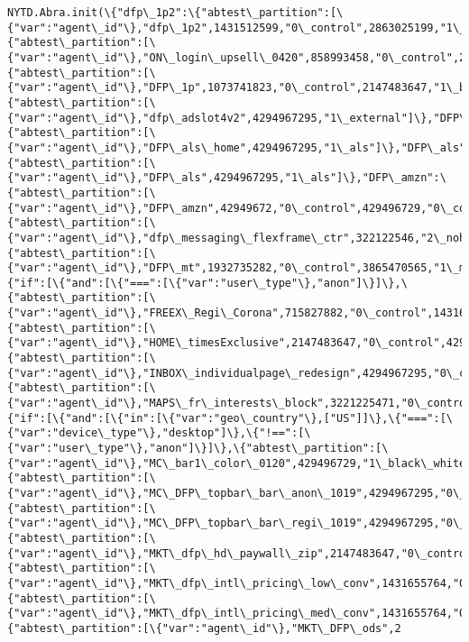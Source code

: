 \documentclass[11pt]{article}
\begin{document}
\begin{Verbatim}[commandchars=\\\{\}]
               NYTD.Abra.init(\{"dfp\_1p2":\{"abtest\_partition":[\{"var":"agent\_id"\},"dfp\_1p2",1431512599,"0\_control",2863025199,"1\_bk",4294537798,"2\_fp"]\},"ON\_login\_upsell\_0420":\{"abtest\_partition":[\{"var":"agent\_id"\},"ON\_login\_upsell\_0420",858993458,"0\_control",2576980377,"1\_offer",4294967295,"2\_brand"]\},"DFP\_1p":\{"abtest\_partition":[\{"var":"agent\_id"\},"DFP\_1p",1073741823,"0\_control",2147483647,"1\_bk",4294967295,"2\_fp"]\},"dfp\_adslot4v2":\{"abtest\_partition":[\{"var":"agent\_id"\},"dfp\_adslot4v2",4294967295,"1\_external"]\},"DFP\_als\_home":\{"abtest\_partition":[\{"var":"agent\_id"\},"DFP\_als\_home",4294967295,"1\_als"]\},"DFP\_als":\{"abtest\_partition":[\{"var":"agent\_id"\},"DFP\_als",4294967295,"1\_als"]\},"DFP\_amzn":\{"abtest\_partition":[\{"var":"agent\_id"\},"DFP\_amzn",42949672,"0\_control",429496729,"0\_control",472446402,"1\_amzn\_fast\_fetch",515396075,"2\_adslot\_priority",901943131,"2\_adslot\_priority",944892804,"3\_no\_mnet"]\},"dfp\_messaging\_flexframe\_ctr":\{"abtest\_partition":[\{"var":"agent\_id"\},"dfp\_messaging\_flexframe\_ctr",322122546,"2\_noheadnosummary",644245093,"1\_msgInv\_noCTA",4294967295,"0\_control"]\},"DFP\_mt":\{"abtest\_partition":[\{"var":"agent\_id"\},"DFP\_mt",1932735282,"0\_control",3865470565,"1\_mt",4294967295,"2\_hdt"]\},"FREEX\_Regi\_Corona":\{"if":[\{"and":[\{"===":[\{"var":"user\_type"\},"anon"]\}]\},\{"abtest\_partition":[\{"var":"agent\_id"\},"FREEX\_Regi\_Corona",715827882,"0\_control",1431655764,"1\_brevity\_callout",2147483647,"2\_brevity",2863311530,"3\_brand",3579139412,"4\_clean\_login",4294967295,"5\_clean\_access"]\}]\},"HOME\_timesExclusive":\{"abtest\_partition":[\{"var":"agent\_id"\},"HOME\_timesExclusive",2147483647,"0\_control",4294967295,"1\_variant"]\},"INBOX\_individualpage\_redesign":\{"abtest\_partition":[\{"var":"agent\_id"\},"INBOX\_individualpage\_redesign",4294967295,"0\_control"]\},"MAPS\_fr\_interests\_block":\{"abtest\_partition":[\{"var":"agent\_id"\},"MAPS\_fr\_interests\_block",3221225471,"0\_control",4294967295,"1\_from\_your\_interests"]\},"MC\_bar1\_color\_0120":\{"if":[\{"and":[\{"in":[\{"var":"geo\_country"\},["US"]]\},\{"===":[\{"var":"device\_type"\},"desktop"]\},\{"!==":[\{"var":"user\_type"\},"anon"]\}]\},\{"abtest\_partition":[\{"var":"agent\_id"\},"MC\_bar1\_color\_0120",429496729,"1\_black\_white",4294967295,"0\_control"]\}]\},"MC\_DFP\_topbar\_bar\_anon\_1019":\{"abtest\_partition":[\{"var":"agent\_id"\},"MC\_DFP\_topbar\_bar\_anon\_1019",4294967295,"0\_control"]\},"MC\_DFP\_topbar\_bar\_regi\_1019":\{"abtest\_partition":[\{"var":"agent\_id"\},"MC\_DFP\_topbar\_bar\_regi\_1019",4294967295,"0\_control"]\},"MKT\_dfp\_hd\_paywall\_zip":\{"abtest\_partition":[\{"var":"agent\_id"\},"MKT\_dfp\_hd\_paywall\_zip",2147483647,"0\_control",4294967295,"1\_zip"]\},"MKT\_dfp\_intl\_pricing\_low\_conv":\{"abtest\_partition":[\{"var":"agent\_id"\},"MKT\_dfp\_intl\_pricing\_low\_conv",1431655764,"0\_control",2863311530,"1\_25cents",4294967295,"2\_50cents"]\},"MKT\_dfp\_intl\_pricing\_med\_conv":\{"abtest\_partition":[\{"var":"agent\_id"\},"MKT\_dfp\_intl\_pricing\_med\_conv",1431655764,"0\_control",2863311530,"1\_50cents",4294967295,"2\_75cents"]\},"MKT\_DFP\_ods":\{"abtest\_partition":[\{"var":"agent\_id"\},"MKT\_DFP\_ods",2
\end{Verbatim}
\end{document}
